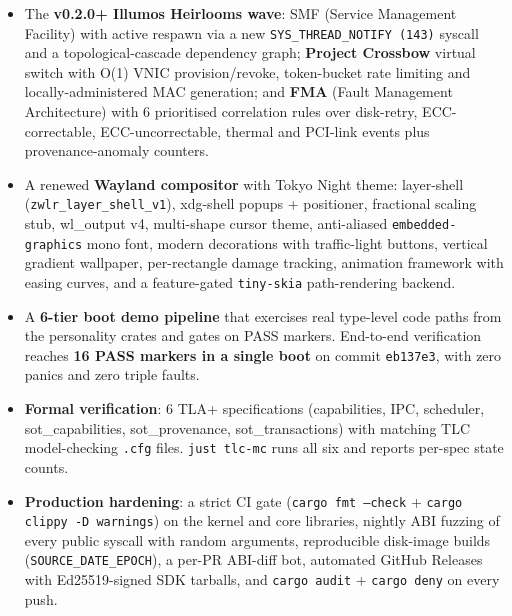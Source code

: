 \documentclass[11pt,a4paper]{article}
\begin{document}
\begin{itemize}[leftmargin=1.4em,itemsep=0.3em]
  \item The \textbf{v0.2.0+ Illumos Heirlooms wave}: SMF (Service
        Management Facility) with active respawn via a new
        \texttt{SYS\_THREAD\_NOTIFY (143)} syscall and a
        topological-cascade dependency graph; \textbf{Project
        Crossbow} virtual switch with O(1) VNIC provision/revoke,
        token-bucket rate limiting and locally-administered MAC
        generation; and \textbf{FMA} (Fault Management Architecture)
        with 6 prioritised correlation rules over disk-retry,
        ECC-correctable, ECC-uncorrectable, thermal and PCI-link
        events plus provenance-anomaly counters.

  \item A renewed \textbf{Wayland compositor} with Tokyo Night
        theme: layer-shell (\texttt{zwlr\_layer\_shell\_v1}),
        xdg-shell popups + positioner, fractional scaling stub,
        wl\_output v4, multi-shape cursor theme, anti-aliased
        \texttt{embedded-graphics} mono font, modern decorations
        with traffic-light buttons, vertical gradient wallpaper,
        per-rectangle damage tracking, animation framework with
        easing curves, and a feature-gated \texttt{tiny-skia}
        path-rendering backend.

  \item A \textbf{6-tier boot demo pipeline} that exercises real
        type-level code paths from the personality crates and
        gates on PASS markers. End-to-end verification reaches
        \textbf{16 PASS markers in a single boot} on commit
        \texttt{eb137e3}, with zero panics and zero triple faults.

  \item \textbf{Formal verification}: 6 TLA+ specifications
        (capabilities, IPC, scheduler, sot\_capabilities,
        sot\_provenance, sot\_transactions) with matching TLC
        model-checking \texttt{.cfg} files. \texttt{just tlc-mc}
        runs all six and reports per-spec state counts.

  \item \textbf{Production hardening}: a strict CI gate
        (\texttt{cargo fmt --check} + \texttt{cargo clippy -D
        warnings}) on the kernel and core libraries, nightly ABI
        fuzzing of every public syscall with random arguments,
        reproducible disk-image builds (\texttt{SOURCE\_DATE\_EPOCH}),
        a per-PR ABI-diff bot, automated GitHub Releases with
        Ed25519-signed SDK tarballs, and \texttt{cargo audit} +
        \texttt{cargo deny} on every push.
\end{itemize}
\end{document}
